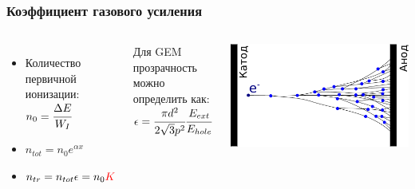 \documentclass[14pt]{beamer}
\begin{document}
\begin{frame}[t]
\frametitle{Коэффициент газового усиления}
\vspace{0pt}
\begin{columns}
\begin{minipage}[t][1\textheight]{\linewidth}
	\small{
		\vspace*{30pt}
		\begin{itemize}
			\item Количество первичной ионизации: $n_{0} = \cfrac{\Delta E}{W_I}$
			\item $n_{tot} = n_{0} e^{\alpha x}$
			\item $\displaystyle n_{tr} = n_{tot} \epsilon = n_{0}\color{red}{K}$
		\end{itemize}
		Для GEM прозрачность можно определить как: 
		$\epsilon = \cfrac{\pi d^2}{2\sqrt{3}p^2}\cfrac{E_{ext}}{E_{hole}}$
	}
\end{minipage}%
\begin{minipage}[t][1\textheight]{\linewidth}
	\vspace*{40pt}
	\center \includegraphics[width=0.9\linewidth]{Electron_avalanche.pdf}
\end{minipage}%
\end{columns}
\end{frame}
\end{document}
